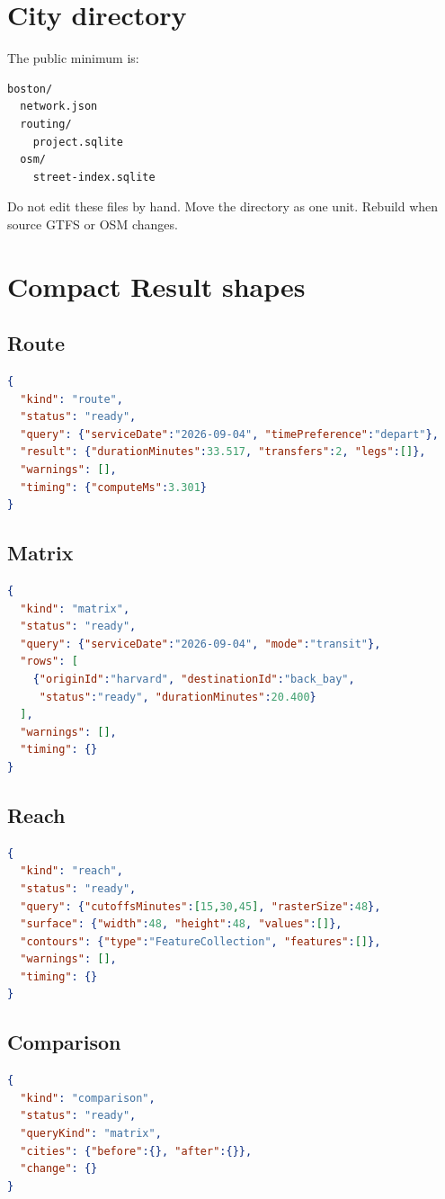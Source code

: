 \documentclass[10pt,letterpaper]{article}
\begin{document}
\section{City directory}

The public minimum is:

\begin{lstlisting}
boston/
  network.json
  routing/
    project.sqlite
  osm/
    street-index.sqlite
\end{lstlisting}

Do not edit these files by hand. Move the directory as one unit. Rebuild when source GTFS or OSM changes.

\section{Compact Result shapes}

\subsection{Route}

\begin{lstlisting}[language=json]
{
  "kind": "route",
  "status": "ready",
  "query": {"serviceDate":"2026-09-04", "timePreference":"depart"},
  "result": {"durationMinutes":33.517, "transfers":2, "legs":[]},
  "warnings": [],
  "timing": {"computeMs":3.301}
}
\end{lstlisting}

\subsection{Matrix}

\begin{lstlisting}[language=json]
{
  "kind": "matrix",
  "status": "ready",
  "query": {"serviceDate":"2026-09-04", "mode":"transit"},
  "rows": [
    {"originId":"harvard", "destinationId":"back_bay",
     "status":"ready", "durationMinutes":20.400}
  ],
  "warnings": [],
  "timing": {}
}
\end{lstlisting}

\subsection{Reach}

\begin{lstlisting}[language=json]
{
  "kind": "reach",
  "status": "ready",
  "query": {"cutoffsMinutes":[15,30,45], "rasterSize":48},
  "surface": {"width":48, "height":48, "values":[]},
  "contours": {"type":"FeatureCollection", "features":[]},
  "warnings": [],
  "timing": {}
}
\end{lstlisting}

\subsection{Comparison}

\begin{lstlisting}[language=json]
{
  "kind": "comparison",
  "status": "ready",
  "queryKind": "matrix",
  "cities": {"before":{}, "after":{}},
  "change": {}
}
\end{lstlisting}
\end{document}
